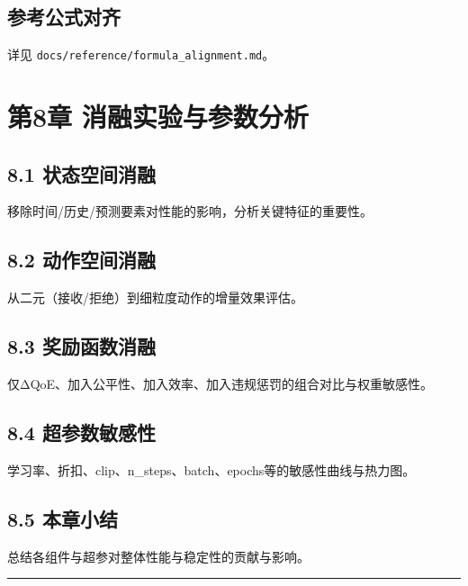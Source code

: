 \subsection{参考公式对齐}\label{ux53c2ux8003ux516cux5f0fux5bf9ux9f50-3}

详见 \texttt{docs/reference/formula\_alignment.md}。

\section{第8章
消融实验与参数分析}\label{ux7b2c8ux7ae0-ux6d88ux878dux5b9eux9a8cux4e0eux53c2ux6570ux5206ux6790}

\subsection{8.1
状态空间消融}\label{ux72b6ux6001ux7a7aux95f4ux6d88ux878d}

移除时间/历史/预测要素对性能的影响，分析关键特征的重要性。

\subsection{8.2
动作空间消融}\label{ux52a8ux4f5cux7a7aux95f4ux6d88ux878d}

从二元（接收/拒绝）到细粒度动作的增量效果评估。

\subsection{8.3
奖励函数消融}\label{ux5956ux52b1ux51fdux6570ux6d88ux878d}

仅ΔQoE、加入公平性、加入效率、加入违规惩罚的组合对比与权重敏感性。

\subsection{8.4
超参数敏感性}\label{ux8d85ux53c2ux6570ux654fux611fux6027}

学习率、折扣、clip、n\_steps、batch、epochs等的敏感性曲线与热力图。

\subsection{8.5 本章小结}\label{ux672cux7ae0ux5c0fux7ed3-3}

总结各组件与超参对整体性能与稳定性的贡献与影响。

\begin{center}\rule{0.5\linewidth}{0.5pt}\end{center}

